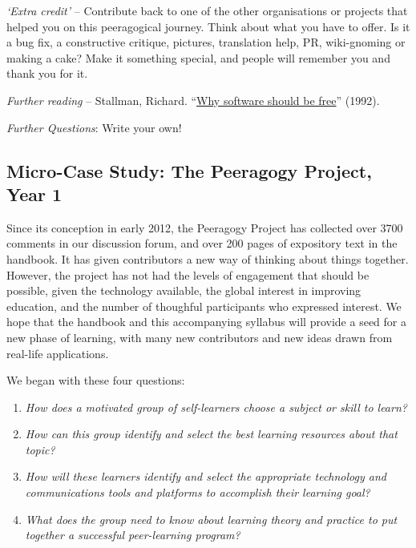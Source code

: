 \emph{`Extra credit'} -- Contribute back to one of the other
organisations or projects that helped you on this peeragogical journey.
Think about what you have to offer. Is it a bug fix, a constructive
critique, pictures, translation help, PR, wiki-gnoming or making a cake?
Make it something special, and people will remember you and thank you
for it.

\emph{Further reading} -- Stallman, Richard.
``\href{http://www.gnu.org/philosophy/shouldbefree.html}{Why software
should be free}'' (1992).

\emph{Further Questions}: Write your own!

\hypertarget{micro-case-study-the-peeragogy-project-year-1}{%
\subsection{\texorpdfstring{{Micro-}Case Study: The Peeragogy Project,
Year
1}{Micro-Case Study: The Peeragogy Project, Year 1}}\label{micro-case-study-the-peeragogy-project-year-1}}

Since its conception in early 2012, the Peeragogy Project has collected
over 3700 comments in our discussion forum, and over 200 pages of
expository text in the handbook. It has given contributors a new way of
thinking about things together. However, the project has not had the
levels of engagement that should be possible, given the technology
available, the global interest in improving education, and the number of
thoughful participants who expressed interest. We hope that the handbook
and this accompanying syllabus will provide a seed for a new phase of
learning, with many new contributors and new ideas drawn from real-life
applications.

We began with these four questions:

\begin{enumerate}
\def\labelenumi{\arabic{enumi}.}
\item
  \emph{How does a motivated group of self-learners choose a subject or
  skill to learn?}
\item
  \emph{How can this group identify and select the best learning
  resources about that topic?}
\item
  \emph{How will these learners identify and select the appropriate
  technology and communications tools and platforms to accomplish their
  learning goal?}
\item
  \emph{What does the group need to know about learning theory and
  practice to put together a successful peer-learning program?}
\end{enumerate}

